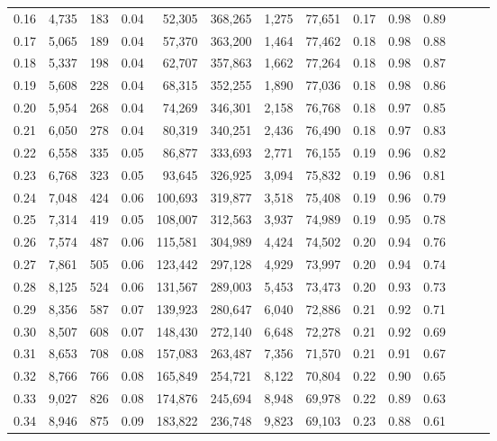 \begin{tabular}{rrrrrrrrrrrrrr}
0.16 &  4,735 &    183 &  0.04 &   52,305 &  368,265 &   1,275 &  77,651 &  0.17 &  0.98 &      0.89 \\
0.17 &  5,065 &    189 &  0.04 &   57,370 &  363,200 &   1,464 &  77,462 &  0.18 &  0.98 &      0.88 \\
0.18 &  5,337 &    198 &  0.04 &   62,707 &  357,863 &   1,662 &  77,264 &  0.18 &  0.98 &      0.87 \\
0.19 &  5,608 &    228 &  0.04 &   68,315 &  352,255 &   1,890 &  77,036 &  0.18 &  0.98 &      0.86 \\
0.20 &  5,954 &    268 &  0.04 &   74,269 &  346,301 &   2,158 &  76,768 &  0.18 &  0.97 &      0.85 \\
0.21 &  6,050 &    278 &  0.04 &   80,319 &  340,251 &   2,436 &  76,490 &  0.18 &  0.97 &      0.83 \\
0.22 &  6,558 &    335 &  0.05 &   86,877 &  333,693 &   2,771 &  76,155 &  0.19 &  0.96 &      0.82 \\
0.23 &  6,768 &    323 &  0.05 &   93,645 &  326,925 &   3,094 &  75,832 &  0.19 &  0.96 &      0.81 \\
0.24 &  7,048 &    424 &  0.06 &  100,693 &  319,877 &   3,518 &  75,408 &  0.19 &  0.96 &      0.79 \\
0.25 &  7,314 &    419 &  0.05 &  108,007 &  312,563 &   3,937 &  74,989 &  0.19 &  0.95 &      0.78 \\
0.26 &  7,574 &    487 &  0.06 &  115,581 &  304,989 &   4,424 &  74,502 &  0.20 &  0.94 &      0.76 \\
0.27 &  7,861 &    505 &  0.06 &  123,442 &  297,128 &   4,929 &  73,997 &  0.20 &  0.94 &      0.74 \\
0.28 &  8,125 &    524 &  0.06 &  131,567 &  289,003 &   5,453 &  73,473 &  0.20 &  0.93 &      0.73 \\
0.29 &  8,356 &    587 &  0.07 &  139,923 &  280,647 &   6,040 &  72,886 &  0.21 &  0.92 &      0.71 \\
0.30 &  8,507 &    608 &  0.07 &  148,430 &  272,140 &   6,648 &  72,278 &  0.21 &  0.92 &      0.69 \\
0.31 &  8,653 &    708 &  0.08 &  157,083 &  263,487 &   7,356 &  71,570 &  0.21 &  0.91 &      0.67 \\
0.32 &  8,766 &    766 &  0.08 &  165,849 &  254,721 &   8,122 &  70,804 &  0.22 &  0.90 &      0.65 \\
0.33 &  9,027 &    826 &  0.08 &  174,876 &  245,694 &   8,948 &  69,978 &  0.22 &  0.89 &      0.63 \\
0.34 &  8,946 &    875 &  0.09 &  183,822 &  236,748 &   9,823 &  69,103 &  0.23 &  0.88 &      0.61 \\

\end{tabular}
